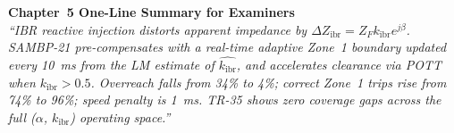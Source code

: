 \documentclass[12pt,a4paper]{article}
\newcommand{\kibr}{k_\mathrm{ibr}}
\newcommand{\DZibr}{\Delta Z_\mathrm{ibr}}
\begin{document}
\vspace{1em}
\begin{center}
\begin{tcolorbox}[colback=iitmnavy!10,colframe=iitmnavy,arc=4pt,boxrule=1pt,width=0.85\textwidth]
\centering
\textbf{Chapter~5 One-Line Summary for Examiners}\\[4pt]
\textit{``IBR reactive injection distorts apparent impedance by $\DZibr = Z_F \kibr e^{j\beta}$. SAMBP-21 pre-compensates with a real-time adaptive Zone~1 boundary updated every 10~ms from the LM estimate of $\hat{\kibr}$, and accelerates clearance via POTT when $\kibr > 0.5$. Overreach falls from 34\% to 4\%; correct Zone~1 trips rise from 74\% to 96\%; speed penalty is 1~ms.  TR-35 shows zero coverage gaps across the full ($\alpha$, $\kibr$) operating space.''}
\end{tcolorbox}
\end{center}
\end{document}
